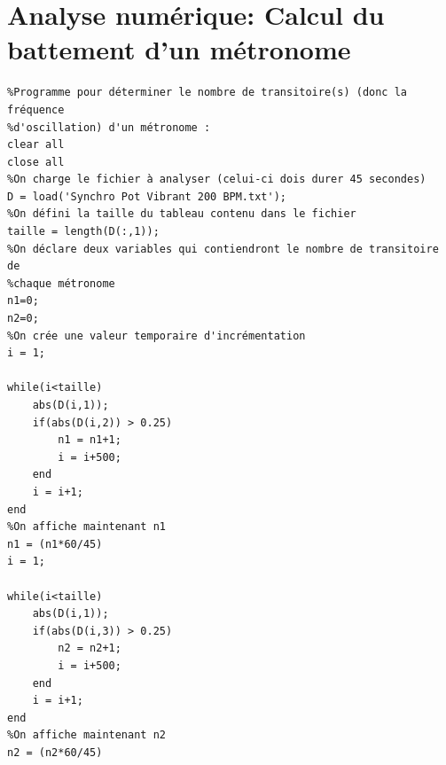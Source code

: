 \documentclass[a4paper,11pt]{report}
\begin{document}
\chapter{Analyse numérique: Calcul du battement d'un métronome}
\label{Battements}
\begin{verbatim}
%Programme pour déterminer le nombre de transitoire(s) (donc la fréquence
%d'oscillation) d'un métronome :
clear all
close all
%On charge le fichier à analyser (celui-ci dois durer 45 secondes)
D = load('Synchro Pot Vibrant 200 BPM.txt');
%On défini la taille du tableau contenu dans le fichier
taille = length(D(:,1));
%On déclare deux variables qui contiendront le nombre de transitoire de
%chaque métronome
n1=0;
n2=0;
%On crée une valeur temporaire d'incrémentation
i = 1;

while(i<taille)
    abs(D(i,1));
    if(abs(D(i,2)) > 0.25)
        n1 = n1+1;
        i = i+500;
    end
    i = i+1;
end
%On affiche maintenant n1
n1 = (n1*60/45)
i = 1;

while(i<taille)
    abs(D(i,1));
    if(abs(D(i,3)) > 0.25)
        n2 = n2+1;
        i = i+500;
    end
    i = i+1;
end
%On affiche maintenant n2
n2 = (n2*60/45)
\end{verbatim}
\end{document}
